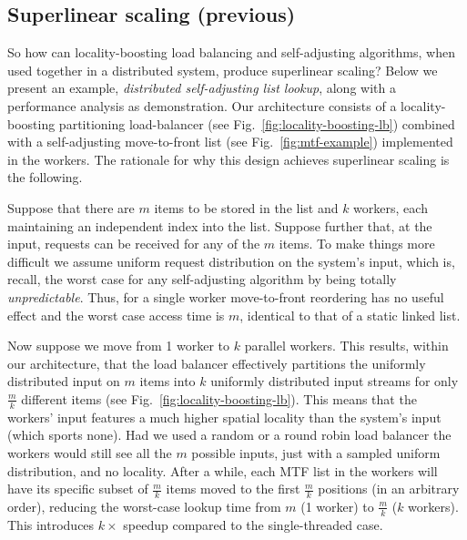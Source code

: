 







\subsection{Superlinear scaling (previous)}
\label{sec:arch-scaling}


So how can locality-boosting load balancing and self-adjusting algorithms, when used together in a distributed system, produce superlinear scaling? Below we present an example, \emph{distributed self-adjusting list lookup}, along with a performance analysis as demonstration. Our architecture consists of a locality-boosting partitioning load-balancer (see Fig.~\ref{fig:locality-boosting-lb}) combined with a self-adjusting move-to-front list (see Fig.~\ref{fig:mtf-example}) implemented in the workers. The rationale for why this design achieves superlinear scaling is the following.

Suppose that there are $m$ items to be stored in the list and $k$ workers, each maintaining an independent index into the list. Suppose further that, at the input, requests can be received for any of the $m$ items. To make things more difficult we assume uniform request distribution on the system's input, which is, recall, the worst case for any self-adjusting algorithm by being totally \emph{unpredictable}. Thus, for a single worker move-to-front reordering has no useful effect and the worst case access time is $m$, identical to that of a static linked list.

Now suppose we move from 1 worker to $k$ parallel workers. This results, within our architecture, that the load balancer effectively partitions the uniformly distributed input on $m$ items into $k$ uniformly distributed input streams for only $\frac{m}{k}$ different items (see Fig.~\ref{fig:locality-boosting-lb}). This means that the workers' input features a much higher spatial locality than the system's input (which sports none).  Had we used a random or a round robin load balancer the workers would still see all the $m$ possible inputs, just with a sampled uniform distribution, and no locality. After a while, each MTF list in the workers will have its specific subset of $\frac{m}{k}$ items moved to the first $\frac{m}{k}$ positions (in an arbitrary order), reducing the worst-case lookup time from $m$ (1 worker) to $\frac{m}{k}$ ($k$ workers). This introduces $k\times$ speedup compared to the single-threaded case.

